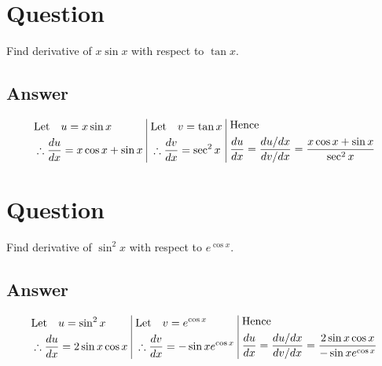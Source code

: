 \documentclass[17pt]{extarticle}
\begin{document}
\noindent
\begin{fleqn} 


\section{Question} 
Find derivative of $x\sin x$ with respect to $\tan x$.

\subsection*{Answer}
\begin{equation} \nonumber
\begin{alignedat}{4}
& \text{Let }\ \  u = x\sin x \\ 
& \therefore \frac{du}{dx} = x\cos x + \sin x\\
\end{alignedat}
\ 
\vrule
\ 
\begin{alignedat}{4}
& \text{Let }\ \  v = \tan x \\ 
& \therefore \frac{dv}{dx} = \sec^2x\\
\end{alignedat}
\ 
\vrule
\ 
\begin{alignedat}{4}
& \text{Hence } \\ 
& \frac{du}{dx} = \frac{du/dx}{dv/dx} = \frac {x\cos x + \sin x}{\sec^2x}\\
\end{alignedat}
\end{equation}

\section{Question} 
Find derivative of $\sin^2x$ with respect to $e^{\cos x}$.

\subsection*{Answer}
\begin{equation} \nonumber
\begin{alignedat}{4}
& \text{Let }\ \  u = \sin^2x \\ 
& \therefore \frac{du}{dx} = 2\sin x \cos x \\
\end{alignedat}
\ 
\vrule
\ 
\begin{alignedat}{4}
& \text{Let }\ \  v = e^{\cos x} \\ 
& \therefore \frac{dv}{dx} = -\sin x e^{\cos x}\\
\end{alignedat}
\ 
\vrule
\ 
\begin{alignedat}{4}
& \text{Hence } \\ 
& \frac{du}{dx} = \frac{du/dx}{dv/dx} = \frac {2\sin x \cos x}{-\sin x e^{\cos x}}\\
\end{alignedat}
\end{equation}


\end{fleqn}
\end{document}

